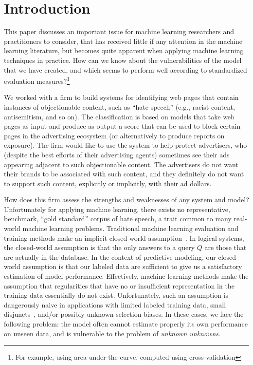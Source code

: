 \section{Introduction}
\label{sec:intro}

This paper discusses an important issue for machine learning researchers and practitioners to consider, that has received little if any attention in the machine learning literature, but becomes quite apparent when applying machine learning techniques in practice. How can we know about the vulnerabilities of the model that we have created, and which seems to perform well according to standardized evaluation measures?\footnote{For example, using area-under-the-curve, computed using cross-validation}

We worked with a firm to build systems for identifying web pages that contain instances of objectionable content, such as ``hate speech'' (e.g., racist content, antisemitism, and so on). The classification is based on models that take web pages as input and produce as output a score that can be used to block certain pages in the advertising ecosystem (or alternatively to produce reports on exposure).  The firm would like to use the system to help protect advertisers, who (despite the best efforts of their advertising agents) sometimes see their ads appearing adjacent to such objectionable content.  The advertisers do not want their brands to be associated with such content, and they definitely do not want to support such content, explicitly or implicitly, with their ad dollars. 



How does this firm assess the strengths and weaknesses of any system
and model?  Unfortunately for applying machine learning, there exists 
no representative, benchmark, ``gold standard'' corpus of hate speech, 
a trait common to many real-world machine learning problems.
Traditional machine learning evaluation and training
methods make an implicit closed-world
assumption~\cite{Reiter77closedworld}. In logical systems, the
closed-world assumption is that the only answers to a query $Q$ are those
that are actually in the database. In the context of predictive
modeling, our closed-world assumption is that our labeled 
data are sufficient to give us a satisfactory estimation of
model performance. Effectively, machine learning methods 
make the assumption that regularities that have no or insufficient
representation in the training data essentially do not exist. 
Unfortunately, such an assumption is dangerously naive 
in applications with limited labeled training
data, small disjuncts~\cite{weiss10disjunct}, and/or possibly unknown
selection biases. In these cases, we face the following problem: 
the model often cannot estimate properly
its own performance on unseen data, and is vulnerable to the problem
of \emph{unknown unknowns}.

